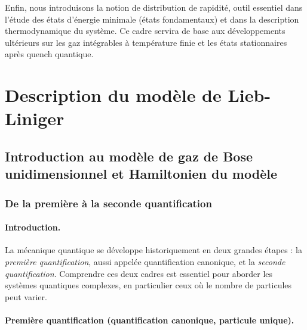 Enfin, nous introduisons la notion de distribution de rapidité, outil essentiel dans l’étude des états d’énergie minimale (états fondamentaux) et dans la description thermodynamique du système. Ce cadre servira de base aux développements ultérieurs sur les gaz intégrables à température finie et les états stationnaires après quench quantique.

\section{Description du modèle de Lieb-Liniger}

\subsection{Introduction au modèle de gaz de Bose unidimensionnel et Hamiltonien du modèle}

\subsubsection{De la première à la seconde quantification}

\paragraph{Introduction.}

La mécanique quantique se développe historiquement en deux grandes étapes : la \emph{première quantification}, aussi appelée quantification canonique, et la \emph{seconde quantification}. Comprendre ces deux cadres est essentiel pour aborder les systèmes quantiques complexes, en particulier ceux où le nombre de particules peut varier.




\paragraph{Première quantification (quantification canonique, particule unique).}

